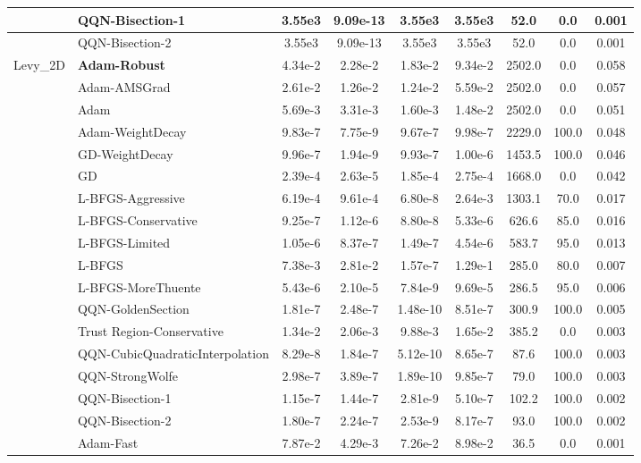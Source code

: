 \documentclass{article}
\begin{document}
\begin{longtable}{|l|l|c|c|c|c|c|c|c|}
\hline
 & QQN-Bisection-1 & 3.55e3 & 9.09e-13 & 3.55e3 & 3.55e3 & 52.0 & 0.0 & 0.001 \\
\hline
 & QQN-Bisection-2 & 3.55e3 & 9.09e-13 & 3.55e3 & 3.55e3 & 52.0 & 0.0 & 0.001 \\
Levy\_2D & \textbf{Adam-Robust} & 4.34e-2 & 2.28e-2 & 1.83e-2 & 9.34e-2 & 2502.0 & 0.0 & 0.058 \\
\hline
 & Adam-AMSGrad & 2.61e-2 & 1.26e-2 & 1.24e-2 & 5.59e-2 & 2502.0 & 0.0 & 0.057 \\
\hline
 & Adam & 5.69e-3 & 3.31e-3 & 1.60e-3 & 1.48e-2 & 2502.0 & 0.0 & 0.051 \\
\hline
 & Adam-WeightDecay & 9.83e-7 & 7.75e-9 & 9.67e-7 & 9.98e-7 & 2229.0 & 100.0 & 0.048 \\
\hline
 & GD-WeightDecay & 9.96e-7 & 1.94e-9 & 9.93e-7 & 1.00e-6 & 1453.5 & 100.0 & 0.046 \\
\hline
 & GD & 2.39e-4 & 2.63e-5 & 1.85e-4 & 2.75e-4 & 1668.0 & 0.0 & 0.042 \\
\hline
 & L-BFGS-Aggressive & 6.19e-4 & 9.61e-4 & 6.80e-8 & 2.64e-3 & 1303.1 & 70.0 & 0.017 \\
\hline
 & L-BFGS-Conservative & 9.25e-7 & 1.12e-6 & 8.80e-8 & 5.33e-6 & 626.6 & 85.0 & 0.016 \\
\hline
 & L-BFGS-Limited & 1.05e-6 & 8.37e-7 & 1.49e-7 & 4.54e-6 & 583.7 & 95.0 & 0.013 \\
\hline
 & L-BFGS & 7.38e-3 & 2.81e-2 & 1.57e-7 & 1.29e-1 & 285.0 & 80.0 & 0.007 \\
\hline
 & L-BFGS-MoreThuente & 5.43e-6 & 2.10e-5 & 7.84e-9 & 9.69e-5 & 286.5 & 95.0 & 0.006 \\
\hline
 & QQN-GoldenSection & 1.81e-7 & 2.48e-7 & 1.48e-10 & 8.51e-7 & 300.9 & 100.0 & 0.005 \\
\hline
 & Trust Region-Conservative & 1.34e-2 & 2.06e-3 & 9.88e-3 & 1.65e-2 & 385.2 & 0.0 & 0.003 \\
\hline
 & QQN-CubicQuadraticInterpolation & 8.29e-8 & 1.84e-7 & 5.12e-10 & 8.65e-7 & 87.6 & 100.0 & 0.003 \\
\hline
 & QQN-StrongWolfe & 2.98e-7 & 3.89e-7 & 1.89e-10 & 9.85e-7 & 79.0 & 100.0 & 0.003 \\
\hline
 & QQN-Bisection-1 & 1.15e-7 & 1.44e-7 & 2.81e-9 & 5.10e-7 & 102.2 & 100.0 & 0.002 \\
\hline
 & QQN-Bisection-2 & 1.80e-7 & 2.24e-7 & 2.53e-9 & 8.17e-7 & 93.0 & 100.0 & 0.002 \\
\hline
 & Adam-Fast & 7.87e-2 & 4.29e-3 & 7.26e-2 & 8.98e-2 & 36.5 & 0.0 & 0.001 \\

\end{longtable}
\end{document}
